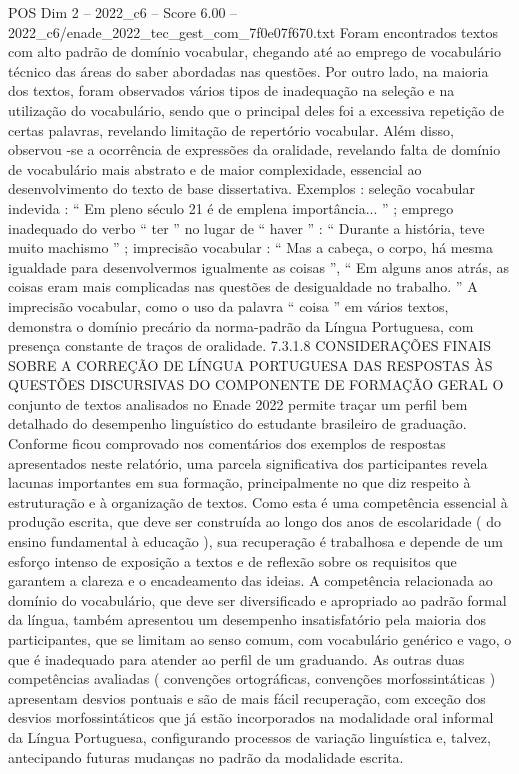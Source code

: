 \begin{textsample}{POS Dim 2 – 2022\_c6 – Score 6.00 – 2022\_c6/enade\_2022\_tec\_gest\_com\_7f0e07f670.txt}
Foram encontrados textos com alto padrão de domínio vocabular, chegando até ao emprego de vocabulário técnico das áreas do saber abordadas nas questões.
Por outro lado, na maioria dos textos, foram observados vários tipos de inadequação na seleção e na utilização do vocabulário, sendo que o principal deles foi a excessiva repetição de certas palavras, revelando limitação de repertório vocabular.
Além disso, observou -se a ocorrência de expressões da oralidade, revelando falta de domínio de vocabulário mais abstrato e de maior complexidade, essencial ao desenvolvimento do texto de base dissertativa.
Exemplos : seleção vocabular indevida : “ Em pleno século 21 é de emplena importância... ” ; emprego inadequado do verbo “ ter ” no lugar de “ haver ” : “ Durante a história, teve muito machismo ” ; imprecisão vocabular : “ Mas a cabeça, o corpo, há mesma igualdade para desenvolvermos igualmente as coisas ”, “ Em alguns anos atrás, as coisas eram mais complicadas nas questões de desigualdade no trabalho. ” A imprecisão vocabular, como o uso da palavra “ coisa ” em vários textos, demonstra o domínio precário da norma-padrão da Língua Portuguesa, com presença constante de traços de oralidade. 7.3.1.8 CONSIDERAÇÕES FINAIS SOBRE A CORREÇÃO DE LÍNGUA PORTUGUESA DAS RESPOSTAS ÀS QUESTÕES DISCURSIVAS DO COMPONENTE DE FORMAÇÃO GERAL O conjunto de textos analisados no Enade 2022 permite traçar um perfil bem detalhado do desempenho linguístico do estudante brasileiro de graduação.
Conforme ficou comprovado nos comentários dos exemplos de respostas apresentados neste relatório, uma parcela significativa dos participantes revela lacunas importantes em sua formação, principalmente no que diz respeito à estruturação e à organização de textos.
Como esta é uma competência essencial à produção escrita, que deve ser construída ao longo dos anos de escolaridade ( do ensino fundamental à educação ), sua recuperação é trabalhosa e depende de um esforço intenso de exposição a textos e de reflexão sobre os requisitos que garantem a clareza e o encadeamento das ideias.
A competência relacionada ao domínio do vocabulário, que deve ser diversificado e apropriado ao padrão formal da língua, também apresentou um desempenho insatisfatório pela maioria dos participantes, que se limitam ao senso comum, com vocabulário genérico e vago, o que é inadequado para atender ao perfil de um graduando.
As outras duas competências avaliadas ( convenções ortográficas, convenções morfossintáticas ) apresentam desvios pontuais e são de mais fácil recuperação, com exceção dos desvios morfossintáticos que já estão incorporados na modalidade oral informal da Língua Portuguesa, configurando processos de variação linguística e, talvez, antecipando futuras mudanças no padrão da modalidade escrita.

\end{textsample}
